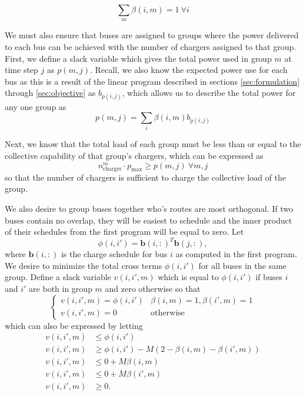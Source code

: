 \begin{equation}\label{eqn:groups:groupId}
	\sum_m\beta(i,m) = 1 \ \forall i
\end{equation}
\par We must also ensure that buses are assigned to groups where the power delivered to each bus can be achieved with the number of chargers assigned to that group. First, we define a slack variable which gives the total power used in group $m$ at time step $j$ as $p(m,j)$. Recall, we also know the expected power use for each bus as this is a result of the linear program described in sections \ref{sec:formulation} through \ref{sec:objective} as $b_{p(i,j)}$, which allows us to describe the total power for any one group as
\begin{equation}\label{eqn:groups:groupPower}
 p(m,j) = \sum_i\beta(i,m)b_{p(i,j)}
\end{equation}
\par Next, we know that the total load of each group must be less than or equal to the collective capability of that group's chargers, which can be expressed as
\begin{equation}\label{eqn:groups:chargeLimit}
	n^m_{\text{charger}}\cdot p_{\text{max}} \ge p(m,j) \ \forall m,j
\end{equation}
so that the number of chargers is sufficient to charge the collective load of the group. 
\par We also desire to group buses together who's routes are most orthogonal. If two buses contain no overlap, they will be easiest to schedule and the inner product of their schedules from the first program will be equal to zero. Let 
\begin{equation*}
\phi(i,i') = \mathbf{b}(i,:)^T\mathbf{b}(j,:),
\end{equation*}
where $\mathbf{b}(i,:)$ is the charge schedule for bus $i$ as computed in the first program. We desire to minimize the total cross terms $\phi(i,i')$ for all buses in the same group.  Define a slack variable $v(i,i',m)$ which is equal to $\phi(i,i')$ if buses $i$ and $i'$ are both in group $m$ and zero otherwise so that
\begin{equation*}
	\begin{cases}
		v(i,i',m) = \phi(i,i') & \beta(i,m) = 1, \beta(i',m) = 1 \\
		v(i,i',m) = 0 & \text{otherwise}
	\end{cases}
\end{equation*}
which can also be expressed by letting
\begin{equation}\label{eqn:groups:innerProd}\begin{aligned}
	v(i,i',m) &\le \phi(i,i') \\
	v(i,i',m) &\ge \phi(i,i') - M\left (2 - \beta(i,m) - \beta(i',m)\right ) \\
	v(i,i',m) &\le 0 + M\beta(i,m) \\
	v(i,i',m) &\le 0 + M\beta(i',m) \\
	v(i,i',m) &\ge 0.
\end{aligned}\end{equation}
